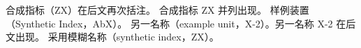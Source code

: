 合成指标（ZX）在后文再次括注。
合成指标 ZX 并列出现。
样例装置（Synthetic Index，AbX）。
另一名称（example unit，X-2）。另一名称 X-2 在后文出现。
采用模糊名称（synthetic index，ZX）。
